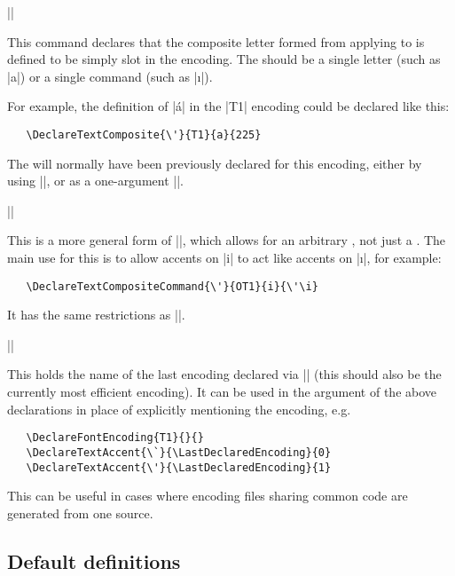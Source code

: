 \documentclass{ltxguide}[1995/11/28]
\begin{document}
\begin{decl}
  |\DeclareTextComposite|   
\end{decl}
This command declares that the composite letter formed from applying
 to  is defined to be simply slot  in the
encoding.  The  should be a single letter (such as |a|) or a
single command (such as |\i|).

For example, the definition of |\'{a}| in the |T1| encoding could be
declared like this:
\begin{verbatim}
   \DeclareTextComposite{\'}{T1}{a}{225}
\end{verbatim}

The  will normally have been previously declared for this
encoding, either by using |\DeclareTextAccent|, or as a one-argument
|\DeclareTextCommand|.

\begin{decl}[1994/12/01]
  |\DeclareTextCompositeCommand|   
\end{decl}
This is a more general form of |\DeclareTextComposite|, which allows for
an arbitrary , not just a .  The main use for this
is to allow accents on |i| to act like accents on |\i|, for example:
\begin{verbatim}
   \DeclareTextCompositeCommand{\'}{OT1}{i}{\'\i}
\end{verbatim}
It has the same restrictions as |\DeclareTextComposite|.


\begin{decl}[1998/12/01]
  |\LastDeclaredEncoding|
\end{decl}
This holds the name of the last encoding declared via
|\DeclareFontEncoding| (this should also be the currently most efficient
encoding).  It can be used in the  argument of the above
declarations in place of explicitly mentioning the encoding, e.g.
\begin{verbatim}
   \DeclareFontEncoding{T1}{}{}
   \DeclareTextAccent{\`}{\LastDeclaredEncoding}{0}
   \DeclareTextAccent{\'}{\LastDeclaredEncoding}{1}
\end{verbatim}
This can be useful in cases where encoding files sharing common code
are generated from one source.

\subsection{Default definitions}
\end{document}
